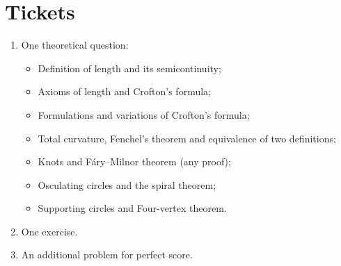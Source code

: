 \chapter{Tickets}


\begin{enumerate}
 \item One theoretical question:
\begin{itemize}
 \item Definition of length and its semicontinuity;
 \item Axioms of length and Crofton's formula;
 \item Formulations and variations of Crofton's formula;
 \item Total curvature, Fenchel's theorem and equivalence of two definitions;
 \item Knots and F\'ary--Milnor theorem (any proof);
 \item Osculating circles and the spiral theorem;
 \item Supporting circles and Four-vertex theorem.
\end{itemize}

\item One exercise.

\item An additional problem for perfect score.
\end{enumerate}

